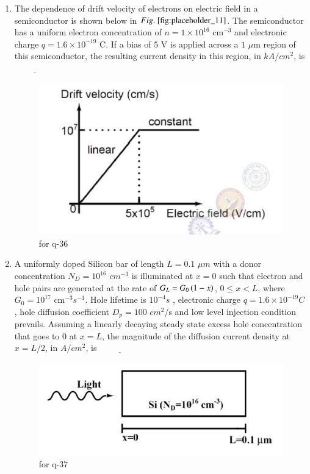 \documentclass[journal,12pt,onecolumn]{IEEEtran}
\theoremstyle{remark}
\begin{document}
\begin{enumerate}
\item The dependence of drift velocity of electrons on electric field in a semiconductor is shown below in $\figref{fig:placeholder_11}$. The semiconductor has a uniform electron concentration of $n = 1 \times 10^{16}$ cm$^{-3}$ and electronic charge $q = 1.6 \times 10^{-19}$ C. If a bias of $5$ V is applied across a $1$ $\mu$m region of this semiconductor, the resulting current density in this region, in $ kA/cm$$^2$, is $\underline{\hspace{2cm}}$
\begin{figure}[H]
    \centering
    \includegraphics[width=0.5\columnwidth]{figs/11.png}
    \caption{\centering for q-36}
    \label{fig:placeholder_11}
\end{figure}

\hfill {}

\item A uniformly doped Silicon bar of length $L = 0.1$ $\mu m $ with a donor concentration $N_D = 10^{16}$ $cm^{-3}$ is illuminated at $x = 0$ such that electron and hole pairs are generated at the rate of $G_L = G_0\left(1 - x\right)$, $0 \leq x < L$, where $G_0 = 10^{17}$ cm$^{-3}$$s^{-1}$. Hole lifetime is $10^{-4}s$ , electronic charge $q = 1.6 \times 10^{-19} C $ , hole diffusion coefficient $D_p = 100$ $cm^2$/s and low level injection condition prevails. Assuming a linearly decaying steady state excess hole concentration that goes to $0$ at $x = L$, the magnitude of the diffusion current density at $x = L/2$, in $A/cm^2$, is $\underline{\hspace{2cm}}$
\begin{figure}[H]
    \centering
    \includegraphics[width=0.5\columnwidth]{figs/12.png}
    \caption{\centering for q-37}
    \label{fig:placeholder_12}
\end{figure}
\hfill {}


\end{enumerate}
\end{document}
